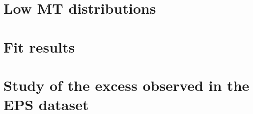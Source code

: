 \documentclass{cmspaper}
\begin{document}
\clearpage
  \section{Low MT distributions}
     \label{app:appendix_lowmt}
     
 
\clearpage
  \section{Fit results}
     \label{app:appendix_fit}
     

\clearpage
  \section{Study of the excess observed in the EPS dataset}
     \label{app:limits_eps}
     

%  
\end{document}
